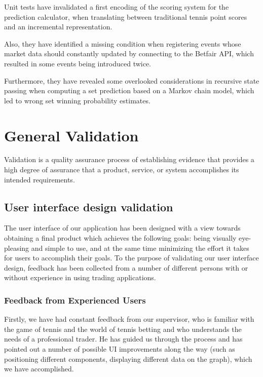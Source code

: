 \documentclass[10pt]{article}
\begin{document}
Unit tests have invalidated a first encoding of the scoring system for the prediction calculator, when translating between traditional tennis point scores and an incremental representation.

Also, they have identified a missing condition when registering events whose market data should constantly updated by connecting to the Betfair API, which resulted in some events being introduced twice.

Furthermore, they have revealed some overlooked considerations in recursive state passing when computing a set prediction based on a Markov chain model, which led to wrong set winning probability estimates. 

\clearpage

\section{General Validation}

Validation is a quality assurance process of establishing evidence that provides a high degree of assurance that a product, service, or system accomplishes its intended requirements.

\subsection{User interface design validation}

The user interface of our application has been designed with a view towards obtaining a final product which achieves the following goals: being visually eye-pleasing and simple to use, and at the same time minimizing the effort it takes for users to accomplish their goals.
To the purpose of validating our user interface design, feedback has been collected from a number of different persons with or without experience in using trading applications.

\subsubsection{Feedback from Experienced Users}

Firstly, we have had constant feedback from our supervisor, who is familiar with the game of tennis and the world of tennis betting and who understands the needs of a professional trader. He has guided us through the process and has pointed out a number of possible UI improvements along the way (such as positioning different components, displaying different data on the graph), which we have accomplished.
\end{document}
